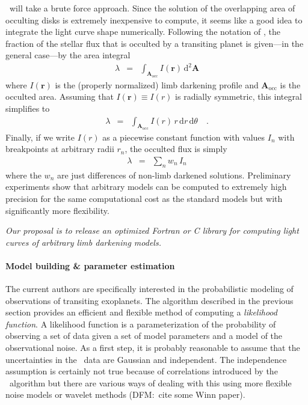 \documentclass[letterpaper,12pt,preprint]{hack_aastex}
\newcommand{\Untrendy}{\package{Untrendy}}
\newcommand{\Bart}{\package{Bart}}
\newcommand{\dd}{\,\mathrm{d}}
\newcommand{\bvec}[1]{\mathbf{#1}}
\begin{document}
\Bart\ will take a brute force approach.
Since the solution of the overlapping area of occulting disks is extremely
inexpensive to compute, it seems like a good idea to integrate the light curve
shape numerically.
Following the notation of \citet{mandel}, the fraction of the stellar flux
that is occulted by a transiting planet is given---in the general case---by
the area integral
\begin{eqnarray}
\lambda & = & \int_{\bvec{A}_\mathrm{occ}} I(\bvec{r}) \dd^2 \bvec{A}
\end{eqnarray}
where $I(\bvec{r})$ is the (properly normalized) limb darkening profile and
$\bvec{A}_\mathrm{occ}$ is the occulted area.
Assuming that $I(\bvec{r}) \equiv I(r)$ is radially symmetric, this integral
simplifies to
\begin{eqnarray}
\lambda & = & \int_{\bvec{A}_\mathrm{occ}} I(r) \, r \dd r \dd \theta \quad.
\end{eqnarray}
Finally, if we write $I(r)$ as a piecewise constant function with values $I_n$
with breakpoints at arbitrary radii $r_n$, the occulted flux is simply
\begin{eqnarray}
\lambda & = & \sum_n w_n \, I_n
\end{eqnarray}
where the $w_n$ are just differences of non-limb darkened solutions.
Preliminary experiments show that arbitrary models can be computed to
extremely high precision for the same computational cost as the standard
\citet{mandel} models but with significantly more flexibility.

\textit{Our proposal is to release an optimized Fortran or C library for
computing light curves of arbitrary limb darkening models.}


\paragraph{Model building \& parameter estimation}
The current authors are specifically interested in the probabilistic modeling
of observations of transiting exoplanets.
The algorithm described in the previous section provides an efficient and
flexible method of computing a \textit{likelihood function}.
A likelihood function is a parameterization of the probability of observing a
set of data given a set of model parameters and a model of the observational
noise.
As a first step, it is probably reasonable to assume that the uncertainties in
the \Kepler\ data are Gaussian and independent.
The independence assumption is certainly not true because of correlations
introduced by the \Untrendy\ algorithm but there are various ways of dealing
with this using more flexible noise models or wavelet methods (DFM:\ cite some
Winn paper).
\end{document}
